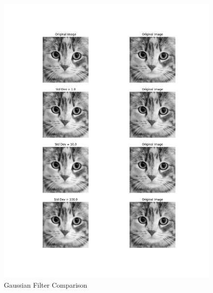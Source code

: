 \documentclass[12pt]{article}
\begin{document}
\begin{figure}
  \centering
  \includegraphics[width=1.0\textwidth]{gaussian_filter_comparison.png}
  \caption{Gaussian Filter Comparison}
  \label{fig:example}
\end{figure}
\end{document}
